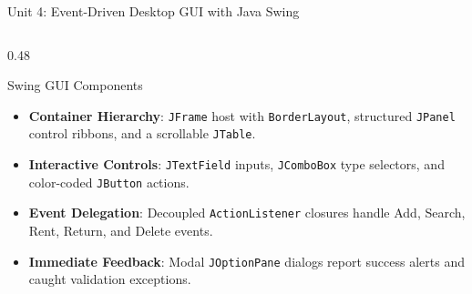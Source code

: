 \documentclass[aspectratio=169,10pt]{beamer}
\begin{document}
\begin{frame}{Unit 4: Event-Driven Desktop GUI with Java Swing}
    \begin{columns}[T]
        \begin{column}{0.48\textwidth}
            \begin{block}{Swing GUI Components}
                \small
                \begin{itemize}
                    \item \textbf{Container Hierarchy}: \texttt{JFrame} host with \texttt{BorderLayout}, structured \texttt{JPanel} control ribbons, and a scrollable \texttt{JTable}.
                    \item \textbf{Interactive Controls}: \texttt{JTextField} inputs, \texttt{JComboBox} type selectors, and color-coded \texttt{JButton} actions.
                    \item \textbf{Event Delegation}: Decoupled \texttt{ActionListener} closures handle Add, Search, Rent, Return, and Delete events.
                    \item \textbf{Immediate Feedback}: Modal \texttt{JOptionPane} dialogs report success alerts and caught validation exceptions.
                \end{itemize}
            \end{block}
        \end{column}
        

\end{columns}
\end{frame}
\end{document}
